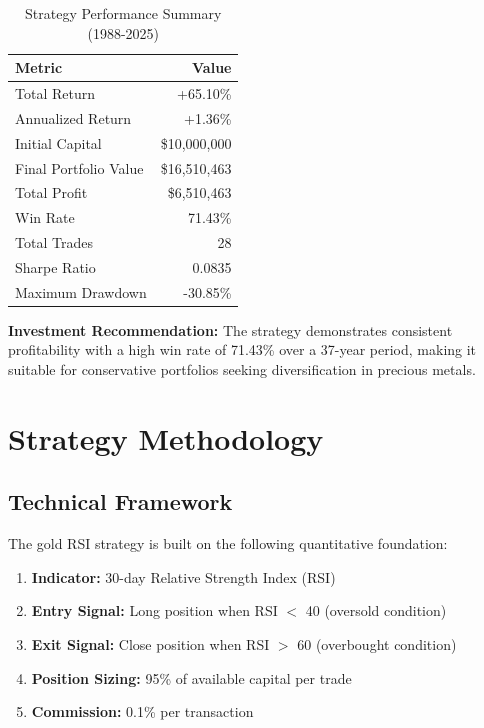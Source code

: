 \documentclass[11pt,a4paper]{article}
\begin{document}
\begin{table}[H]
\centering
\begin{tabular}{lr}
\toprule
\textbf{Metric} & \textbf{Value} \\
\midrule
Total Return & \textcolor{profit}{+65.10\%} \\
Annualized Return & \textcolor{profit}{+1.36\%} \\
Initial Capital & \$10,000,000 \\
Final Portfolio Value & \textcolor{profit}{\$16,510,463} \\
Total Profit & \textcolor{profit}{\$6,510,463} \\
Win Rate & \textcolor{profit}{71.43\%} \\
Total Trades & 28 \\
Sharpe Ratio & 0.0835 \\
Maximum Drawdown & \textcolor{loss}{-30.85\%} \\
\bottomrule
\end{tabular}
\caption{Strategy Performance Summary (1988-2025)}
\end{table}

\textbf{Investment Recommendation:} The strategy demonstrates consistent profitability with a high win rate of 71.43\% over a 37-year period, making it suitable for conservative portfolios seeking diversification in precious metals.

\vspace{1cm}  

\section{Strategy Methodology}

\subsection{Technical Framework}

The gold RSI strategy is built on the following quantitative foundation:

\begin{enumerate}[leftmargin=*]
    \item \textbf{Indicator:} 30-day Relative Strength Index (RSI)
    \item \textbf{Entry Signal:} Long position when RSI $<$ 40 (oversold condition)
    \item \textbf{Exit Signal:} Close position when RSI $>$ 60 (overbought condition)
    \item \textbf{Position Sizing:} 95\% of available capital per trade
    \item \textbf{Commission:} 0.1\% per transaction
\end{enumerate}
\end{document}
